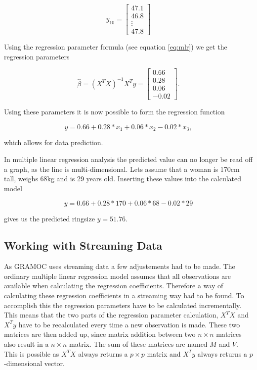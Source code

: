 \begin{equation}
    y_{10} =
    \begin{bmatrix}
        47.1 \\
        46.8 \\
        \vdots \\
        47.8
    \end{bmatrix}
\end{equation}

Using the regression parameter formula (see equation \vref{eq:mlr}) we get the regression parameters

\begin{equation}
    \hat{\beta} = (X^TX)^{-1} X^Ty =
    \begin{bmatrix}
        0.66 \\
        0.28 \\
        0.06 \\
        -0.02
    \end{bmatrix}.
\end{equation}

Using these parameters it is now possible to form the regression function

\begin{equation}
    y = 0.66 + 0.28 * x_1 + 0.06 * x_2 - 0.02 * x_3,
\end{equation}

which allows for data prediction.

In multiple linear regression analysis the predicted value can no longer be read off a graph, as the line is multi-dimensional. Lets assume that a woman is 170cm tall, weighs 68kg and is 29 years old. Inserting these values into the calculated model

\begin{equation}
    y = 0.66 + 0.28 * 170 + 0.06 * 68 - 0.02 * 29
\end{equation}

gives us the predicted ringsize $ y = 51.76 $.

\subsection{Working with Streaming Data}

As GRAMOC uses streaming data a few adjustements had to be made. The ordinary multiple linear regression model assumes that all observations are available when calculating the regression coefficients. Therefore a way of calculating these regression coefficients in a streaming way had to be found. To accomplish this the regression parameters have to be calculated incrementally. This means that the two parts of the regression parameter calculation, $ X^T X $ and $ X^T y $ have to be recalculated every time a new observation is made. These two matrices are then added up, since matrix addition between two $ n \times n$ matrices also result in a $ n \times n$ matrix. The sum of these matrices are named $ M $ and $ V $. This is possible as $ X^T X $ always returns a $ p \times p $ matrix and $ X^T y $ always returns a $ p $-dimensional vector.

